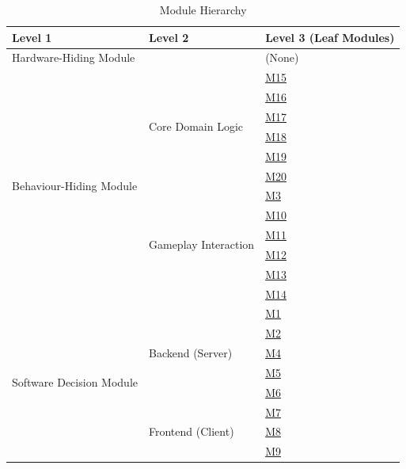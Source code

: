 \documentclass[12pt, titlepage]{article}
\begin{document}
\begin{table}[H]
\centering
\begin{tabular}{p{} p{} p{}}
\toprule
\textbf{Level 1} & \textbf{Level 2} & \textbf{Level 3 (Leaf Modules)}\\
\midrule

\multirow{1}{0.3\textwidth}{Hardware-Hiding Module} & ~ & (None) \\
\midrule

\multirow{12}{0.3\textwidth}{Behaviour-Hiding Module}
& \multirow{6}{0.26\textwidth}{Core Domain Logic} & \hyperref[sec:game-engine-module]{M15} \\
& & \hyperref[sec:rules-module]{M16} \\
& & \hyperref[sec:scoring-module]{M17} \\
& & \hyperref[sec:base-conversion-module]{M18} \\
& & \hyperref[sec:game-actions-module]{M19} \\
& & \hyperref[sec:numeral-system-module]{M20} \\
\cmidrule{2-3}
& \multirow{6}{0.26\textwidth}{Gameplay Interaction} & \hyperref[sec:matchmaking-module]{M3} \\
& & \hyperref[sec:lobby-view-module]{M10} \\
& & \hyperref[sec:game-board-view-module]{M11} \\
& & \hyperref[sec:move-controller-module]{M12} \\
& & \hyperref[sec:scoreboard-view-module]{M13} \\
& & \hyperref[sec:profile-view-module]{M14} \\
\midrule

\multirow{8}{0.3\textwidth}{Software Decision Module} & \multirow{5}{0.26\textwidth}{Backend (Server)} & \hyperref[sec:api-module]{M1} \\
& & \hyperref[sec:realtime-gateway-module]{M2} \\
& & \hyperref[sec:authentication-module]{M4} \\
& & \hyperref[sec:repository-module]{M5} \\
& & \hyperref[sec:audit-module]{M6} \\
\cmidrule{2-3}
& \multirow{3}{0.26\textwidth}{Frontend (Client)} & \hyperref[sec:realtime-client-module]{M7} \\
& & \hyperref[sec:app-shell-module]{M8} \\
& & \hyperref[sec:authentication-client-module]{M9} \\
\bottomrule

\end{tabular}
\caption{Module Hierarchy}
\label{TblMH}
\end{table}
\end{document}
